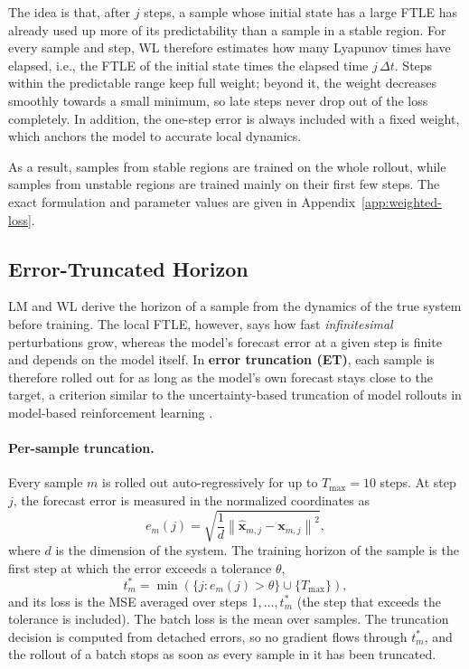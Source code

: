 \documentclass{article}
\begin{document}
The idea is that, after $j$ steps, a sample whose initial state has a large FTLE has already used up more of its predictability than a sample in a stable region. For every sample and step, WL therefore estimates how many Lyapunov times have elapsed, i.e., the FTLE of the initial state times the elapsed time $j\,\Delta t$. Steps within the predictable range keep full weight; beyond it, the weight decreases smoothly towards a small minimum, so late steps never drop out of the loss completely. In addition, the one-step error is always included with a fixed weight, which anchors the model to accurate local dynamics.

As a result, samples from stable regions are trained on the whole rollout, while samples from unstable regions are trained mainly on their first few steps. The exact formulation and parameter values are given in Appendix~\ref{app:weighted-loss}.

\subsection{Error-Truncated Horizon}
\label{sec:et}

LM and WL derive the horizon of a sample from the dynamics of the true system before training. The local FTLE, however, says how fast \emph{infinitesimal} perturbations grow, whereas the model's forecast error at a given step is finite and depends on the model itself. In \textbf{error truncation (ET)}, each sample is therefore rolled out for as long as the model's own forecast stays close to the target, a criterion similar to the uncertainty-based truncation of model rollouts in model-based reinforcement learning \cite{frauenknecht_trust_2024}.

\paragraph{Per-sample truncation.}
Every sample $m$ is rolled out auto-regressively for up to $T_{\max} = 10$ steps. At step $j$, the forecast error is measured in the normalized coordinates as
\[
e_m(j) = \sqrt{\frac{1}{d} \left\| \hat{\mathbf{x}}_{m,j} - \mathbf{x}_{m,j} \right\|^2},
\]
where $d$ is the dimension of the system. The training horizon of the sample is the first step at which the error exceeds a tolerance $\theta$,
\[
t^*_m = \min\left( \{ j : e_m(j) > \theta \} \cup \{ T_{\max} \} \right),
\]
and its loss is the MSE averaged over steps $1, \dots, t^*_m$ (the step that exceeds the tolerance is included). The batch loss is the mean over samples. The truncation decision is computed from detached errors, so no gradient flows through $t^*_m$, and the rollout of a batch stops as soon as every sample in it has been truncated.
\end{document}
